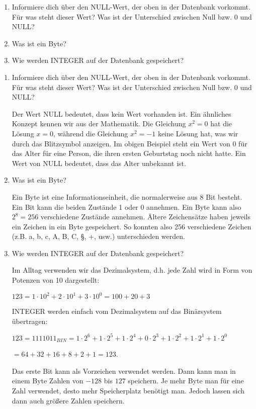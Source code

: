\begin{Exercise}[title={Beantworte folgende Fragen; Du kannst das Internet zu Rate ziehen.}, label=Datentypen]
	\begin{enumerate}
		\item Informiere dich über den NULL-Wert, der oben in der Datenbank vorkommt. Für was steht dieser Wert? Was ist der Unterschied zwischen Null bzw. 0 und NULL?
		\item Was ist ein Byte?
		\item Wie werden INTEGER auf der Datenbank gespeichert?
	\end{enumerate}
\end{Exercise}
\begin{Answer}[ref=Datentypen]
	\begin{enumerate}
		\item Informiere dich über den NULL-Wert, der oben in der Datenbank vorkommt. Für was steht dieser Wert? Was ist der Unterschied zwischen Null bzw. 0 und NULL?

		Der Wert NULL bedeutet, dass kein Wert vorhanden ist. Ein ähnliches Konzept kennen wir aus der Mathematik. Die Gleichung \(x^2=0\) hat die Lösung \(x=0\), während die Gleichung \(x^2=-1\) keine Lösung hat, was wir durch das Blitzsymbol \Lightning\normalsize anzeigen. Im obigen Beispiel steht ein Wert von 0 für das Alter für eine Person, die ihren ersten Geburtstag noch nicht hatte. Ein Wert von NULL bedeutet, dass das Alter unbekannt ist.
		\item Was ist ein Byte?

		Ein Byte ist eine Informationseinheit, die normalerweise aus 8 Bit besteht. Ein Bit kann die beiden Zustände 1 oder 0 annehmen. Ein Byte kann also \(2^8=256\) verschiedene Zustände annehmen. Ältere Zeichensätze haben jeweils ein Zeichen in ein Byte gespeichert. So konnten also 256 verschiedene Zeichen (z.B. a, b, c, A, B, C, §, +, usw.) unterschieden werden.
		\item Wie werden INTEGER auf der Datenbank gespeichert?

		Im Alltag verwenden wir das Dezimalsystem, d.h. jede Zahl wird in Form von Potenzen von 10 dargestellt:

		\(123=1\cdot10^2+2\cdot 10^1+3\cdot 10^0=100+20+3\)

		INTEGER werden einfach vom Dezimalsystem auf das Binärsystem übertragen:

		\(123=1111011_{BIN}=1\cdot2^6+1\cdot2^5+1\cdot2^4+0\cdot2^3+1\cdot2^2+1\cdot2^1+1\cdot2^0\)

		\(=64+32+16+8+2+1=123\).

		Das erste Bit kann als Vorzeichen verwendet werden. Dann kann man in einem Byte Zahlen von \(-128\) bis \(127\) speichern. Je mehr Byte man für eine Zahl verwendet, desto mehr Speicherplatz benötigt man. Jedoch lassen sich dann auch größere Zahlen speichern.
	\end{enumerate}
\end{Answer}